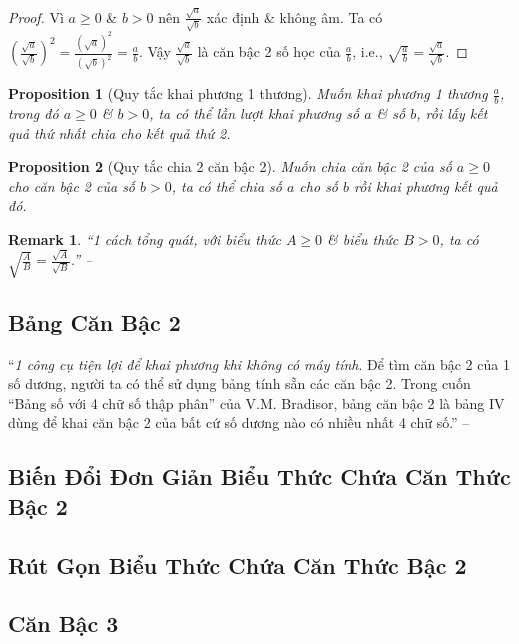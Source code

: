 \documentclass{article}
\numberwithin{equation}{section}
\newtheorem{proposition}{Proposition}[section]
\newtheorem{remark}{Remark}[section]
\begin{document}
\begin{proof}
	Vì $a\ge 0$ \& $b > 0$ nên $\frac{\sqrt{a}}{\sqrt{b}}$ xác định \& không âm. Ta có $\left(\frac{\sqrt{a}}{\sqrt{b}}\right)^2 = \frac{(\sqrt{a})^2}{(\sqrt{b})^2} = \frac{a}{b}$. Vậy $\frac{\sqrt{a}}{\sqrt{b}}$ là căn bậc 2 số học của $\frac{a}{b}$, i.e., $\sqrt{\frac{a}{b}} = \frac{\sqrt{a}}{\sqrt{b}}$.
\end{proof}

\begin{proposition}[Quy tắc khai phương 1 thương]
	Muốn khai phương 1 thương $\frac{a}{b}$, trong đó $a\ge 0$ \& $b > 0$, ta có thể lần lượt khai phương số $a$ \& số $b$, rồi lấy kết quả thứ nhất chia cho kết quả thứ 2.
\end{proposition}

\begin{proposition}[Quy tắc chia 2 căn bậc 2]
	Muốn chia căn bậc 2 của số $a\ge 0$ cho căn bậc 2 của số $b > 0$, ta có thể chia số $a$ cho số $b$ rồi khai phương kết quả đó.
\end{proposition}

\begin{remark}
	``1 cách tổng quát, với biểu thức $A\ge 0$ \& biểu thức $B > 0$, ta có $\sqrt{\frac{A}{B}} = \frac{\sqrt{A}}{\sqrt{B}}$.'' -- \cite[p. 18]{SGK_Toan_9_tap_1}
\end{remark}

\subsection{Bảng Căn Bậc 2}
``\textit{1 công cụ tiện lợi để khai phương khi không có máy tính}. Để tìm căn bậc 2 của 1 số dương, người ta có thể sử dụng bảng tính sẵn các căn bậc 2. Trong cuốn ``Bảng số với 4 chữ số thập phân'' của V.M. Bradisor, bảng căn bậc 2 là bảng IV dùng để khai căn bậc 2 của bất cứ số dương nào có nhiều nhất 4 chữ số.'' -- \cite[p. 20]{SGK_Toan_9_tap_1}

\subsection{Biến Đổi Đơn Giản Biểu Thức Chứa Căn Thức Bậc 2}

\subsection{Rút Gọn Biểu Thức Chứa Căn Thức Bậc 2}

\subsection{Căn Bậc 3}
\end{document}
